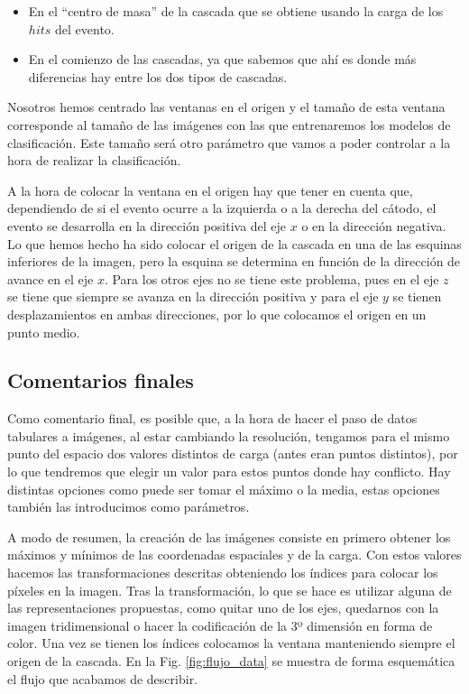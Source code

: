 \documentclass[a4paper,12pt,oneside,titlepage]{book}
\begin{document}
\begin{itemize}
  \item En el ``centro de masa'' de la cascada que se obtiene usando la carga de los $hits$ del evento.
  \item En el comienzo de las cascadas, ya que sabemos que ahí es donde más diferencias hay entre los dos tipos de cascadas.
\end{itemize}

Nosotros hemos centrado las ventanas en el origen y el tamaño de esta ventana corresponde al tamaño de las imágenes con las que entrenaremos los modelos de clasificación. Este tamaño será otro parámetro que vamos a poder controlar a la hora de realizar la clasificación.

A la hora de colocar la ventana en el origen hay que tener en cuenta que, dependiendo de si el evento ocurre a la izquierda o a la derecha del cátodo, el evento se desarrolla en la dirección positiva del eje $x$ o en la dirección negativa. Lo que hemos hecho ha sido colocar el origen de la cascada en una de las esquinas inferiores de la imagen, pero la esquina se determina en función de la dirección de avance en el eje $x$. Para los otros ejes no se tiene este problema, pues en el eje $z$ se tiene que siempre se avanza en la dirección positiva y para el eje $y$ se tienen desplazamientos en ambas direcciones, por lo que colocamos el origen en un punto medio.

\subsection{Comentarios finales}

Como comentario final, es posible que, a la hora de hacer el paso de datos tabulares a imágenes, al estar cambiando la resolución, tengamos para el mismo punto del espacio dos valores distintos de carga (antes eran puntos distintos), por lo que tendremos que elegir un valor para estos puntos donde hay conflicto. Hay distintas opciones como puede ser tomar el máximo o la media, estas opciones también las introducimos como parámetros.
 
A modo de resumen, la creación de las imágenes consiste en primero obtener los máximos y mínimos de las coordenadas espaciales y de la carga. Con estos valores hacemos las transformaciones descritas obteniendo los índices para colocar los píxeles en la imagen. Tras la transformación, lo que se hace es utilizar alguna de las representaciones propuestas, como quitar uno de los ejes, quedarnos con la imagen tridimensional o hacer la codificación de la 3º dimensión en forma de color. Una vez se tienen los índices colocamos la ventana manteniendo siempre el origen de la cascada. En la Fig. \ref{fig:flujo_data} se muestra de forma esquemática el flujo que acabamos de describir.
\end{document}
